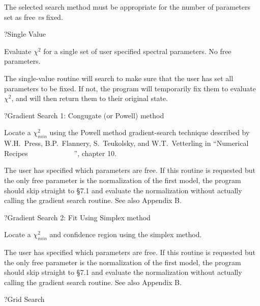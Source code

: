 {\list

The selected search method must be appropriate for the number of parameters set
as free {\it vs} fixed.

}
 
\??Single Value

{\listlist
 

Evaluate $\chi^{2}$ for
a single set of user specified spectral parameters.
No free parameters.

The single-value routine will search to make sure that the user has
set all parameters to be fixed.
If not, the program will temporarily fix them to evaluate $\chi^2$,
and will then return them to their original state.

}
 
\??Gradient Search 1: Congugate (or Powell) method

{\listlist

Locate a $\chi_{min}^{2}$ using the Powell method gradient-search technique described
by W.H.~Press, B.P.~Flannery, S.~Teukolsky, and W.T.~Vetterling in ``Numerical
Recipes~~~~~~~~~~~~~'', chapter 10.

The user has specified which parameters are free.  If this routine is
requested but the only free parameter is the normalization of the first
model, the program should skip straight to \S7.1 and
evaluate the normalization without actually calling the gradient
search routine.  See also Appendix B.

}

\??Gradient Search 2:  Fit Using Simplex method

{\listlist

Locate a $\chi_{min}^{2}$ and confidence region using the simplex method.

The user has specified which parameters are free.  If this routine is
requested but the only free parameter is the normalization of the first
model, the program should skip straight to \S7.1 and
evaluate the normalization without actually calling the gradient
search routine.  See also Appendix B.
 
}


\??Grid Search

